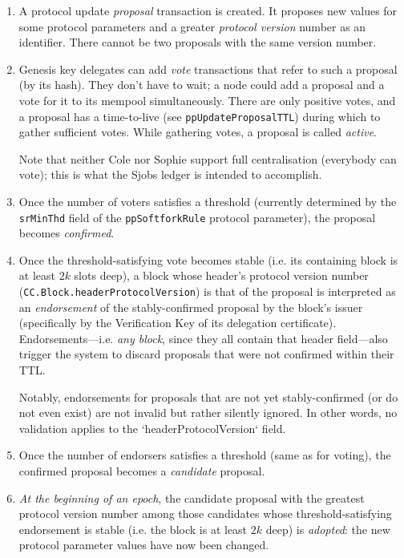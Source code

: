 \begin{enumerate}

\item
A protocol update \emph{proposal} transaction is created. It proposes new values
for some protocol parameters and a greater \emph{protocol version} number as an
identifier. There cannot be two proposals with the same version number.

\item
Genesis key delegates can add \emph{vote} transactions that refer to such a
proposal (by its hash). They don't have to wait; a node could add a proposal and
a vote for it to its mempool simultaneously. There are only positive votes, and
a proposal has a time-to-live (see \lstinline!ppUpdateProposalTTL!) during which
to gather sufficient votes. While gathering votes, a proposal is called
\emph{active}.

Note that neither Cole nor Sophie support full centralisation (everybody can
vote); this is what the Sjobs ledger is intended to accomplish.

\item
Once the number of voters satisfies a threshold (currently determined by the
\lstinline!srMinThd! field of the \lstinline!ppSoftforkRule! protocol
parameter), the proposal becomes \emph{confirmed}.

\item
Once the threshold-satisfying vote becomes stable (i.e. its containing block is at
least $2k$ slots deep), a block whose header's protocol version number
(\lstinline!CC.Block.headerProtocolVersion!) is that of the proposal is
interpreted as an \emph{endorsement} of the stably-confirmed proposal by the
block's issuer (specifically by the Verification Key of its delegation
certificate). Endorsements---i.e. \emph{any block}, since they all contain that
header field---also trigger the system to discard proposals that were not
confirmed within their TTL.

Notably, endorsements for proposals that are not yet stably-confirmed (or do not
even exist) are not invalid but rather silently ignored. In other words, no
validation applies to the `headerProtocolVersion` field.

\item
Once the number of endorsers satisfies a threshold (same as for voting), the
confirmed proposal becomes a \emph{candidate} proposal.

\item
\emph{At the beginning of an epoch}, the candidate proposal with the greatest
protocol version number among those candidates whose threshold-satisfying
endorsement is stable (i.e. the block is at least $2k$ deep) is \emph{adopted}:
the new protocol parameter values have now been changed.


\end{enumerate}
